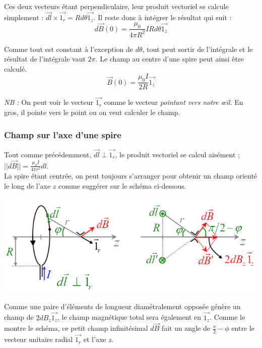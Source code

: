 \documentclass	[11pt, a4paper, openany]{book}
\begin{document}
Ces deux vecteurs étant perpendiculaire, leur produit vectoriel se calcule simplement : $\vec{dl} \times \vec{1_r} = Rd\theta\vec{1_z}$. Il reste donc à intégrer le résultat qui suit :
\begin{equation}
d\vec{B}(0) = \frac{\mu_0}{4\pi R^2}IRd\theta\vec{1_z}
\end{equation}

Comme tout est constant à l'exception de $d\theta$, tout peut sortir de l'intégrale et le résultat de l'intégrale vaut $2\pi$. Le champ au centre d'une spire peut ainsi être calculé.
\begin{equation}
\vec{B}(0) = \frac{\mu_0 I}{2R}\vec{1_z}
\end{equation}

\textit{NB :} On peut voir le vecteur $\vec{1_r}$ comme le vecteur \textit{pointant vers  notre œil}. En gros, il pointe vers le point ou on veut calculer le champ.

\subsubsection{Champ sur l'axe d'une spire}
Tout comme précédemment, $\vec{dl} \perp \vec{1_r}$, le produit vectoriel se calcul aisément ; $||d\vec{B}|| = \frac{\mu_0 I}{4\pi r^2}dl$.\\
La spire étant centrée, on peut toujours s'arranger pour obtenir un champ orienté le long de l'axe $z$ comme suggérer sur le schéma ci-dessous.

\begin{center}
\includegraphics[scale=0.70]{magneto/image9.png}
\end{center}



Comme une paire d'éléments de longueur diamétralement opposée génère un champ de $2dB_z\vec{1_z}$, le champ magnétique total sera également en $\vec{1_z}$. Comme le montre le schéma, ce petit champ infinitésimal $d\vec{B}$ fait un angle de $\frac{\pi}{2} - \phi$ entre le vecteur unitaire radial $\vec{1_r}$ et l'axe $z$.\\
\end{document}
